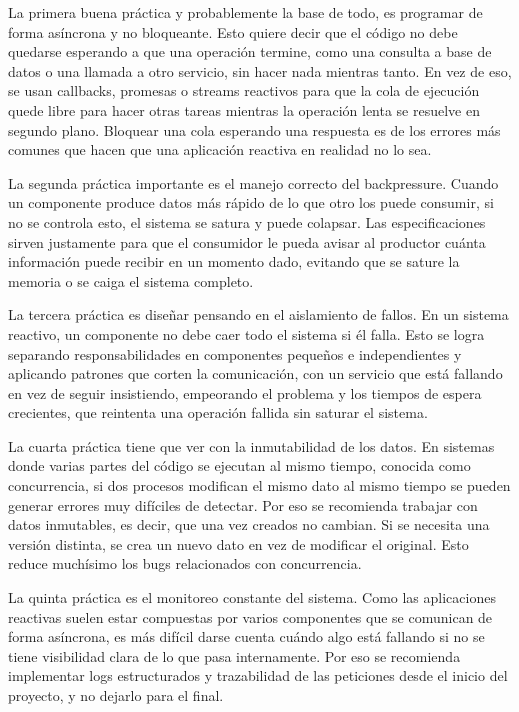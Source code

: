 \documentclass[12pt,letterpaper]{article}
\begin{document}
La primera buena práctica y probablemente la base de todo, es programar de forma asíncrona y no bloqueante. Esto quiere decir que el código no debe quedarse esperando a que una operación termine, como una consulta a base de datos o una llamada a otro servicio, sin hacer nada mientras tanto. En vez de eso, se usan callbacks, promesas o streams reactivos para que la cola de ejecución quede libre para hacer otras tareas mientras la operación lenta se resuelve en segundo plano. Bloquear una cola esperando una respuesta es de los errores más comunes que hacen que una aplicación reactiva en realidad no lo sea.

La segunda práctica importante es el manejo correcto del backpressure. Cuando un componente produce datos más rápido de lo que otro los puede consumir, si no se controla esto, el sistema se satura y puede colapsar. Las especificaciones sirven justamente para que el consumidor le pueda avisar al productor cuánta información puede recibir en un momento dado, evitando que se sature la memoria o se caiga el sistema completo.

La tercera práctica es diseñar pensando en el aislamiento de fallos. En un sistema reactivo, un componente no debe caer todo el sistema si él falla. Esto se logra separando responsabilidades en componentes pequeños e independientes y aplicando patrones que corten la comunicación, con un servicio que está fallando en vez de seguir insistiendo, empeorando el problema y los tiempos de espera crecientes, que reintenta una operación fallida sin saturar el sistema.

La cuarta práctica tiene que ver con la inmutabilidad de los datos. En sistemas donde varias partes del código se ejecutan al mismo tiempo, conocida como concurrencia, si dos procesos modifican el mismo dato al mismo tiempo se pueden generar errores muy difíciles de detectar. Por eso se recomienda trabajar con datos inmutables, es decir, que una vez creados no cambian. Si se necesita una versión distinta, se crea un nuevo dato en vez de modificar el original. Esto reduce muchísimo los bugs relacionados con concurrencia.

La quinta práctica es el monitoreo constante del sistema. Como las aplicaciones reactivas suelen estar compuestas por varios componentes que se comunican de forma asíncrona, es más difícil darse cuenta cuándo algo está fallando si no se tiene visibilidad clara de lo que pasa internamente. Por eso se recomienda implementar logs estructurados y trazabilidad de las peticiones desde el inicio del proyecto, y no dejarlo para el final.
\end{document}
